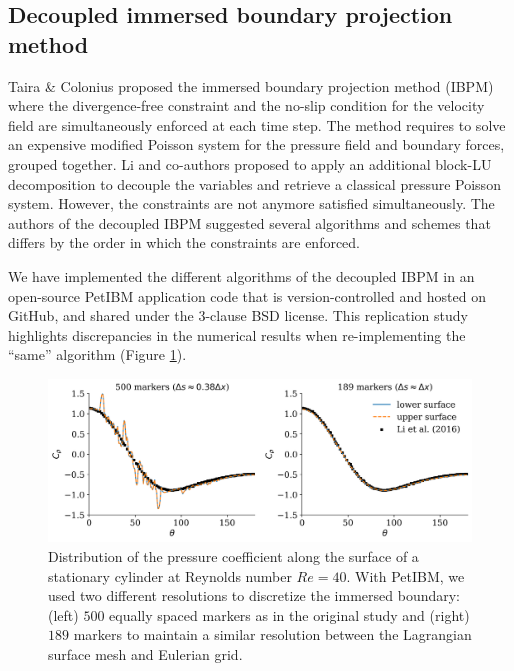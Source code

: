 \documentclass{parcfd}
\begin{document}
\subsection{Decoupled immersed boundary projection method}

Taira \& Colonius \cite{taira_colonius_2007} proposed the immersed boundary projection method (IBPM) where the divergence-free constraint and the no-slip condition for the velocity field are simultaneously enforced at each time step.
The method requires to solve an expensive modified Poisson system for the pressure field and boundary forces, grouped together.
Li and co-authors \cite{li_et_al_2016} proposed to apply an additional block-LU decomposition to decouple the variables and retrieve a classical pressure Poisson system.
However, the constraints are not anymore satisfied simultaneously.
The authors of the decoupled IBPM suggested several algorithms and schemes that differs by the order in which the constraints are enforced.

We have implemented the different algorithms of the decoupled IBPM in an open-source PetIBM application code that is version-controlled and hosted on GitHub, and shared under the 3-clause BSD license.
This replication study highlights discrepancies in the numerical results when re-implementing the ``same'' algorithm (Figure \ref{fig:cylinder2dRe40:pressure_coefficient}).

\begin{figure}
    \centering
    \includegraphics[width=\linewidth]{cylinder2dRe40_pressure_coefficient.png}
    \caption{Distribution of the pressure coefficient along the surface of a stationary cylinder at Reynolds number $Re = 40$. With PetIBM, we used two different resolutions to discretize the immersed boundary: (left) $500$ equally spaced markers as in the original study \cite{li_et_al_2016} and (right) $189$ markers to maintain a similar resolution between the Lagrangian surface mesh and Eulerian grid.}
    \label{fig:cylinder2dRe40:pressure_coefficient}
\end{figure}
\end{document}

